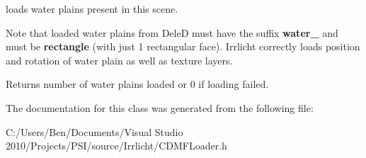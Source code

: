 \begin{DoxyVerb}loads water plains present in this scene.
\end{DoxyVerb}
 Note that loaded water plains from Dele\-D must have the suffix {\bfseries water\-\_\-} and must be {\bfseries rectangle} (with just 1 rectangular face). Irrlicht correctly loads position and rotation of water plain as well as texture layers. \begin{DoxyReturn}{Returns}
number of water plains loaded or 0 if loading failed. 
\end{DoxyReturn}


The documentation for this class was generated from the following file\-:\begin{DoxyCompactItemize}
\item 
C\-:/\-Users/\-Ben/\-Documents/\-Visual Studio 2010/\-Projects/\-P\-S\-I/source/\-Irrlicht/C\-D\-M\-F\-Loader.\-h\end{DoxyCompactItemize}
